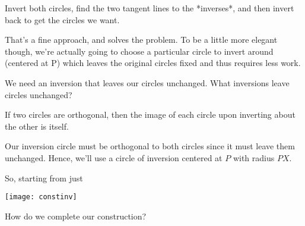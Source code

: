 Invert both circles, find the two tangent lines to the *inverses*, and then invert back to get the circles we want.

That's a fine approach, and solves the problem.  To be a little more elegant though, we're actually going to choose a particular circle to invert around (centered at P) which leaves the original circles fixed and thus requires less work.

We need an inversion that leaves our circles unchanged.  What inversions leave circles unchanged?






If two circles are orthogonal, then the image of each circle upon inverting about the other is itself.


Our inversion circle must be orthogonal to both circles since it must leave them unchanged.  Hence, we'll use a circle of inversion centered at $P$ with radius $PX$.

So, starting from just

\begin{center}
    \texttt{[image: constinv]}    
\end{center}

How do we complete our construction?

